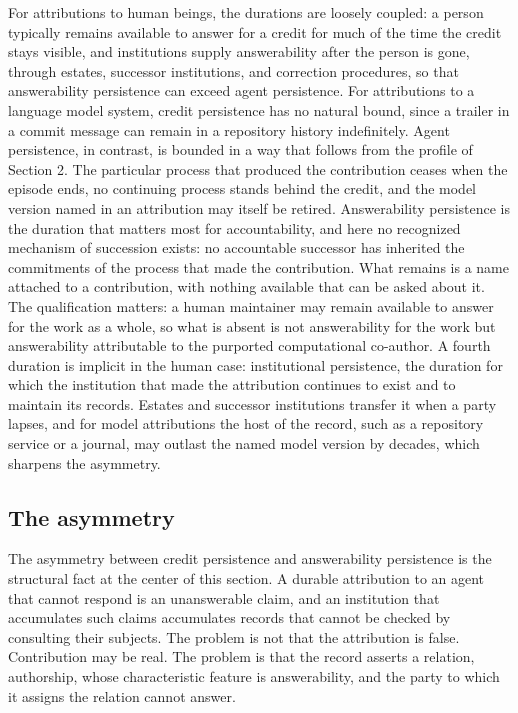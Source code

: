 \documentclass[12pt]{article}
\theoremstyle{definition}
\theoremstyle{plain}
\begin{document}
For attributions to human beings, the durations are loosely coupled: a person typically remains available to answer for a credit for much of the time the credit stays visible, and institutions supply answerability after the person is gone, through estates, successor institutions, and correction procedures, so that answerability persistence can exceed agent persistence. For attributions to a language model system, credit persistence has no natural bound, since a trailer in a commit message can remain in a repository history indefinitely. Agent persistence, in contrast, is bounded in a way that follows from the profile of Section 2. The particular process that produced the contribution ceases when the episode ends, no continuing process stands behind the credit, and the model version named in an attribution may itself be retired. Answerability persistence is the duration that matters most for accountability, and here no recognized mechanism of succession exists: no accountable successor has inherited the commitments of the process that made the contribution. What remains is a name attached to a contribution, with nothing available that can be asked about it. The qualification matters: a human maintainer may remain available to answer for the work as a whole, so what is absent is not answerability for the work but answerability attributable to the purported computational co-author. A fourth duration is implicit in the human case: institutional persistence, the duration for which the institution that made the attribution continues to exist and to maintain its records. Estates and successor institutions transfer it when a party lapses, and for model attributions the host of the record, such as a repository service or a journal, may outlast the named model version by decades, which sharpens the asymmetry.

\subsection{The asymmetry}

The asymmetry between credit persistence and answerability persistence is the structural fact at the center of this section. A durable attribution to an agent that cannot respond is an unanswerable claim, and an institution that accumulates such claims accumulates records that cannot be checked by consulting their subjects. The problem is not that the attribution is false. Contribution may be real. The problem is that the record asserts a relation, authorship, whose characteristic feature is answerability, and the party to which it assigns the relation cannot answer.
\end{document}
